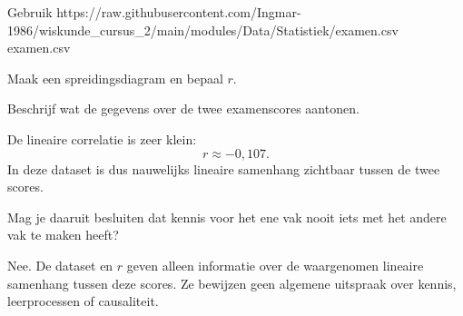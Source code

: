 \documentclass{ximera}
\begin{document}
\begin{oefening}{\oefU \ESS}

Gebruik \csv
{https://raw.githubusercontent.com/Ingmar-1986/wiskunde_cursus_2/main/modules/Data/Statistiek/examen.csv}
{examen.csv}

Maak een spreidingsdiagram en bepaal $r$.

\begin{question}
Beschrijf wat de gegevens over de twee examenscores aantonen.

\begin{oplossing}
De lineaire correlatie is zeer klein:
\[
r\approx-0{,}107.
\]
In deze dataset is dus nauwelijks lineaire samenhang zichtbaar tussen
de twee scores.
\end{oplossing}
\end{question}

\begin{question}
Mag je daaruit besluiten dat kennis voor het ene vak nooit iets met
het andere vak te maken heeft?

\begin{oplossing}
Nee. De dataset en $r$ geven alleen informatie over de waargenomen
lineaire samenhang tussen deze scores. Ze bewijzen geen algemene
uitspraak over kennis, leerprocessen of causaliteit.
\end{oplossing}
\end{question}

\end{oefening}
\end{document}
